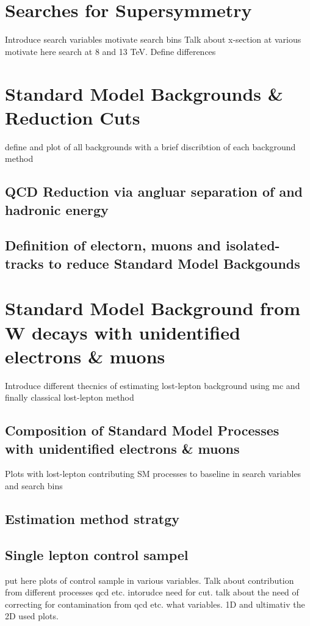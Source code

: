 \chapter{Searches for Supersymmetry}
\label{sec:SUSY_Search_Intro}
\todo Introduce search variables motivate search bins
\todo Talk about x-section at various \CM motivate here search at 8 and 13 TeV. Define differences

\chapter{Standard Model Backgrounds \& Reduction Cuts}
\label{sec:SM_BackGrounds}
\todo define and plot of all backgrounds with a brief discribtion of each background method
\section{QCD Reduction via angluar separation of \met and hadronic energy}

\section{Definition of electorn, muons and isolated-tracks to reduce Standard Model Backgounds}
\label{sec:Lepton_Definition_Study}

\chapter{Standard Model Background from W decays with unidentified electrons \& muons}
\label{sec:Lost_Lepton_Main}
\todo Introduce different thecnics of estimating lost-lepton background using mc and finally classical lost-lepton method
\section{Composition of Standard Model Processes with unidentified electrons \& muons}
\label{sec:Lost_Lepton_Composition}
\todo Plots with lost-lepton contributing SM processes to baseline in search variables and search bins

\section{Estimation method stratgy}


\section{Single lepton control sampel}
\label{sec:Lost_Lepton_CS}
\todo put here plots of control sample in various variables. Talk about contribution from different processes qcd etc. intorudce need for \mt cut.
talk about the need of correcting for contamination from qcd etc. what variables. 1D and ultimativ the 2D used plots.
